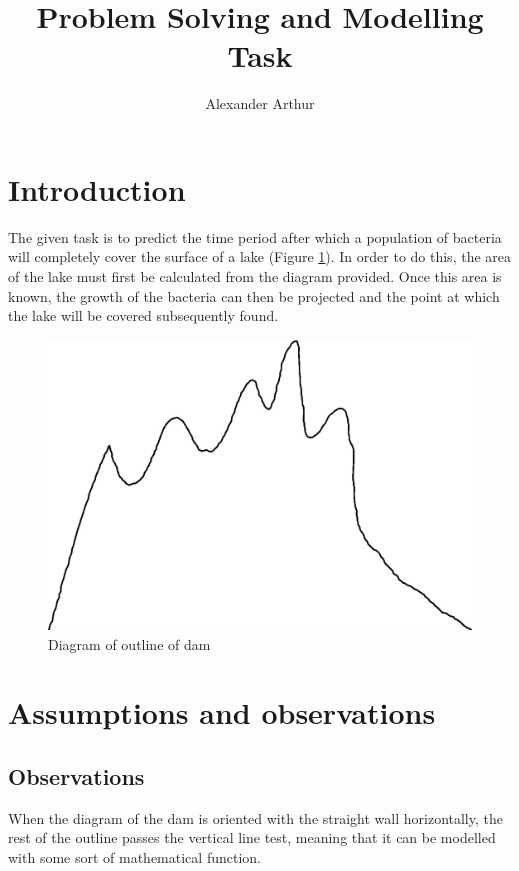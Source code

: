 \documentclass{article}
\title{Problem Solving and Modelling Task}
\author{Alexander Arthur}
\begin{document}
\maketitle
\setcounter{tocdepth}{1}
\tableofcontents



\section{Introduction}
    The given task is to predict the time period after which a population of bacteria will completely cover the surface of a lake (Figure \ref{figDamOutline}). In order to do this, the area of the lake must first be calculated from the diagram provided. Once this area is known, the growth of the bacteria can then be projected and the point at which the lake will be covered subsequently found.

    \begin{figure}
        \centering
        \includegraphics[width = 12cm]{dam cropped}
        \caption{Diagram of outline of dam}
        \label{figDamOutline}
    \end{figure}



\section{Assumptions and observations}

    \subsection{Observations}

    When the diagram of the dam is oriented with the straight wall horizontally, the rest of the outline passes the vertical line test, meaning that it can be modelled with some sort of mathematical function.
\end{document}
